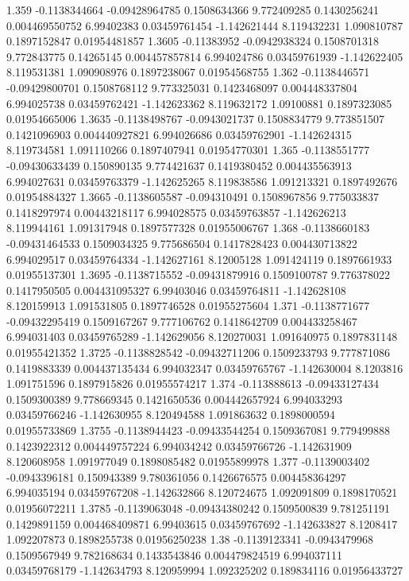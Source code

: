 {1.359 -0.1138344664 -0.09428964785 0.1508634366 9.772409285 0.1430256241 0.004469550752 6.99402383 0.03459761454 -1.142621444 8.119432231 1.090810787 0.1897152847 0.01954481857
1.3605 -0.11383952 -0.0942938324 0.1508701318 9.772843775 0.14265145 0.004457857814 6.994024786 0.03459761939 -1.142622405 8.119531381 1.090908976 0.1897238067 0.01954568755
1.362 -0.1138446571 -0.09429800701 0.1508768112 9.773325031 0.1423468097 0.004448337804 6.994025738 0.03459762421 -1.142623362 8.119632172 1.09100881 0.1897323085 0.01954665006
1.3635 -0.1138498767 -0.0943021737 0.1508834779 9.773851507 0.1421096903 0.004440927821 6.994026686 0.03459762901 -1.142624315 8.119734581 1.091110266 0.1897407941 0.01954770301
1.365 -0.1138551777 -0.09430633439 0.150890135 9.774421637 0.1419380452 0.004435563913 6.994027631 0.03459763379 -1.142625265 8.119838586 1.091213321 0.1897492676 0.01954884327
1.3665 -0.1138605587 -0.094310491 0.1508967856 9.775033837 0.1418297974 0.00443218117 6.994028575 0.03459763857 -1.142626213 8.119944161 1.091317948 0.1897577328 0.01955006767
1.368 -0.1138660183 -0.09431464533 0.1509034325 9.775686504 0.1417828423 0.004430713822 6.994029517 0.03459764334 -1.142627161 8.12005128 1.091424119 0.1897661933 0.01955137301
1.3695 -0.1138715552 -0.09431879916 0.1509100787 9.776378022 0.1417950505 0.004431095327 6.99403046 0.03459764811 -1.142628108 8.120159913 1.091531805 0.1897746528 0.01955275604
1.371 -0.1138771677 -0.09432295419 0.1509167267 9.777106762 0.1418642709 0.004433258467 6.994031403 0.03459765289 -1.142629056 8.120270031 1.091640975 0.1897831148 0.01955421352
1.3725 -0.1138828542 -0.09432711206 0.1509233793 9.777871086 0.1419883339 0.004437135434 6.994032347 0.03459765767 -1.142630004 8.1203816 1.091751596 0.1897915826 0.01955574217
1.374 -0.113888613 -0.09433127434 0.1509300389 9.778669345 0.1421650536 0.004442657924 6.994033293 0.03459766246 -1.142630955 8.120494588 1.091863632 0.1898000594 0.01955733869
1.3755 -0.1138944423 -0.09433544254 0.1509367081 9.779499888 0.1423922312 0.004449757224 6.994034242 0.03459766726 -1.142631909 8.120608958 1.091977049 0.1898085482 0.01955899978
1.377 -0.1139003402 -0.0943396181 0.150943389 9.780361056 0.1426676575 0.004458364297 6.994035194 0.03459767208 -1.142632866 8.120724675 1.092091809 0.1898170521 0.01956072211
1.3785 -0.1139063048 -0.09434380242 0.1509500839 9.781251191 0.1429891159 0.004468409871 6.99403615 0.03459767692 -1.142633827 8.1208417 1.092207873 0.1898255738 0.01956250238
1.38 -0.1139123341 -0.0943479968 0.1509567949 9.782168634 0.1433543846 0.004479824519 6.994037111 0.03459768179 -1.142634793 8.120959994 1.092325202 0.189834116 0.01956433727
}
